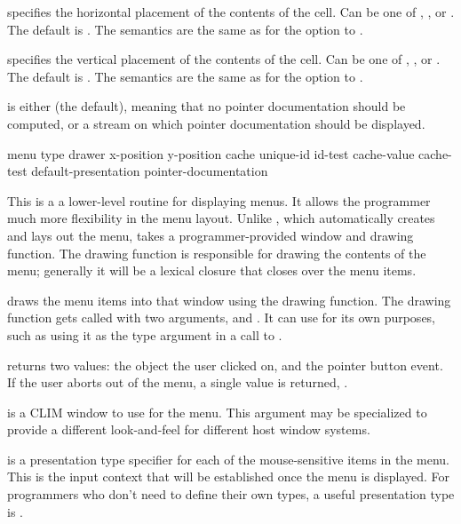  specifies the horizontal placement of the contents of the
cell.  Can be one of , , or .  The default is
.   The semantics are the same as for the  option to
.

 specifies the vertical placement of the contents of the cell.
Can be one of , , or .  The default is
.  The semantics are the same as for the  option to
.

 is either  (the default), meaning that no
pointer documentation should be computed, or a stream on which pointer
documentation should be displayed.


 {menu type drawer
                                       \key x-position y-position
                                            cache unique-id id-test cache-value cache-test
                                            default-presentation pointer-documentation}

This is a a lower-level routine for displaying menus.  It allows the programmer
much more flexibility in the menu layout.  Unlike , which
automatically creates and lays out the menu,  takes
a programmer-provided window and drawing function.  The drawing function is
responsible for drawing the contents of the menu; generally it will be a lexical
closure that closes over the menu items.

 draws the menu items into that window using the
drawing function.  The drawing function gets called with two arguments,
 and .  It can use  for its own purposes, such
as using it as the type argument in a call to .

 returns two values: the object the user clicked on,
and the pointer button event.  If the user aborts out of the menu, a single
value is returned, .

 is a CLIM window to use for the menu.  This argument may be
specialized to provide a different look-and-feel for different host window
systems.

 is a presentation type specifier for each of the mouse-sensitive
items in the menu.  This is the input context that will be established once the
menu is displayed.  For programmers who don't need to define their own types, a
useful presentation type is .

